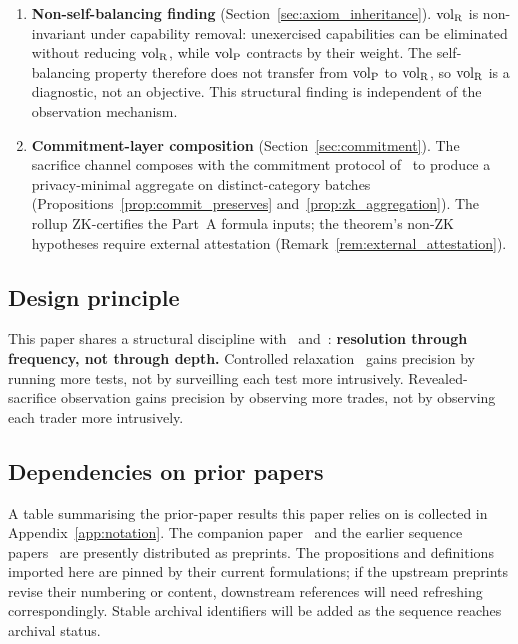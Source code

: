 \begin{enumerate}
\item \textbf{Non-self-balancing finding}
  (Section~\ref{sec:axiom_inheritance}).
  ${\operatorname{vol}_{\mathrm{R}}}$ is non-invariant under capability removal:
  unexercised capabilities can be eliminated without reducing
  ${\operatorname{vol}_{\mathrm{R}}}$, while ${\operatorname{vol}_{\mathrm{P}}}$ contracts by their weight.  The
  self-balancing property therefore does not transfer from
  ${\operatorname{vol}_{\mathrm{P}}}$ to ${\operatorname{vol}_{\mathrm{R}}}$, so ${\operatorname{vol}_{\mathrm{R}}}$ is a diagnostic, not an
  objective.  This structural finding is independent of the
  observation mechanism.

\item \textbf{Commitment-layer composition}
  (Section~\ref{sec:commitment}).
  The sacrifice channel composes with the commitment protocol
  of~\citep[Exogenous~Verification]{lasser2026exo} to produce a privacy-minimal
  aggregate on distinct-category batches
  (Propositions~\ref{prop:commit_preserves}
  and~\ref{prop:zk_aggregation}).  The rollup ZK-certifies the
  Part~A formula inputs; the theorem's non-ZK hypotheses
  require external attestation
  (Remark~\ref{rem:external_attestation}).
\end{enumerate}

\subsection{Design principle}
\label{sec:design_principle}

This paper shares a structural discipline
with~\citep[Phase~Redundancy]{lasser2026phase} and~\citep[Controlled~Relaxation]{lasser2026wamura}:
\textbf{resolution through frequency, not through depth.}
Controlled relaxation~\citep[Controlled~Relaxation]{lasser2026wamura} gains precision
by running more tests, not by surveilling each test more
intrusively.  Revealed-sacrifice observation gains precision by
observing more trades, not by observing each trader more
intrusively.

\subsection{Dependencies on prior papers}
\label{sec:dependencies}

A table summarising the prior-paper results this paper relies on
is collected in Appendix~\ref{app:notation}.  The companion
paper~\citep[Need~Sufficiency]{lasser2026paper8b} and the earlier sequence
papers~\citep{lasser2026gfm,lasser2026poset,lasser2026horizon,lasser2026scm,lasser2026exo,lasser2026phase,lasser2026wamura}
are presently distributed as preprints.  The propositions and
definitions imported here are pinned by their current
formulations; if the upstream preprints revise their numbering
or content, downstream references will need refreshing
correspondingly.  Stable archival identifiers will be added
as the sequence reaches archival status.
